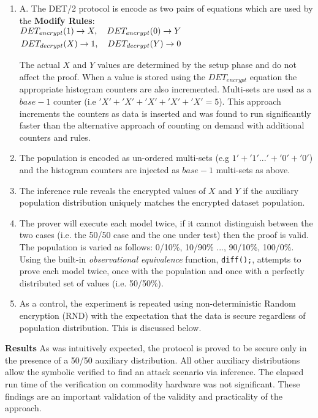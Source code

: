 \documentclass[runningheads]{llncs}
\begin{document}
\begin{enumerate}[label=(\Alph*)]
        \item A. The DET/2 protocol is encode as two pairs of equations which are used by the \textbf{Modify Rules}:\\
        
    
    $\begin{aligned} DET_{encrypt}(1) \rightarrow X,\quad	DET_{encrypt}(0) \rightarrow Y\\
    DET_{decrypt}(X) \rightarrow  1,\quad   DET_{decrypt}(Y) \rightarrow  0 \end{aligned}\\$
    
    The actual $X$ and $Y$ values are determined by the setup phase and do not affect the proof.
	When a value is stored using the $DET_{encrypt}$ equation the appropriate histogram counters are also incremented. Multi-sets are used as a $base-1$ counter (i.e $'X'+'X'+'X'+'X'+'X' = 5$).  This approach increments the counters as data is inserted and was found to run significantly faster than the alternative approach of counting on demand with additional counters and rules.
\item The \aux{} population is encoded as un-ordered multi-sets (e.g $ 1' + '1' ... ' + '0' + '0'$) and the \aux{} histogram counters are injected as $base-1$ multi-sets as above. 
\item The inference rule reveals the encrypted values of $X$ and $Y$ if the auxiliary population distribution uniquely matches the encrypted dataset population.
\item The prover will execute each model twice, if it cannot distinguish between the two cases (i.e. the 50/50 case and the one under test) then the proof is valid. The population is varied as follows: 0/10\%, 10/90\% ..., 90/10\%, 100/0\%. 
Using the built-in \textit{observational equivalence} function, \texttt{diff();}, \tamarin{} attempts to prove each model twice, once with the \aux{} population and once with a perfectly distributed set of values (i.e. 50/50\%). 
\item As a control, the experiment is repeated using non-deterministic Random encryption (RND) with the expectation that the data is secure regardless of population distribution. This is discussed below.
\end{enumerate}
\textbf{Results} As was intuitively expected, the protocol is proved to be secure only in the presence of a 50/50 auxiliary distribution. All other auxiliary distributions allow the symbolic verified to find an attack scenario via inference. The elapsed run time of the verification on commodity hardware was not significant. These findings are an important validation of the validity and practicality of the approach.
\end{document}
